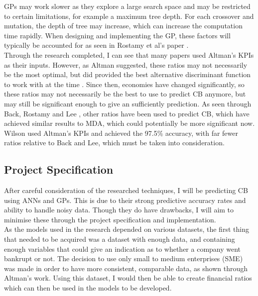 \documentclass[11pt]{article}
\begin{document}
GPs may work slower as they explore a large search space and may be restricted to certain limitations, for example a maximum tree depth. For each crossover and mutation, the depth of tree may increase, which can increase the computation time rapidly. When designing and implementing the GP, these factors will typically be accounted for as seen in Rostamy et al's paper \cite{ref-twelve}. \\

Through the research completed, I can see that many papers used Altman's KPIs as their inputs. However, as Altman suggested, these ratios may not necessarily be the most optimal, but did provided the best alternative discriminant function to work with at the time \cite{ref-six}. Since then, economies have changed significantly, so these ratios may not necessarily be the best to use to predict CB anymore, but may still be significant enough to give an sufficiently prediction. As seen through Back, Rostamy and Lee \cite{ref-thirt,ref-twelve, ref-eleven}, other ratios have been used to predict CB, which have achieved similar results to MDA, which could potentially be more significant now. Wilson used Altman's KPIs and achieved the 97.5\% accuracy, with far fewer ratios relative to Back and Lee, which must be taken into consideration.
\subsection{Project Specification}\label{subsec:proj}
After careful consideration of the researched techniques, I will be predicting CB using ANNs and GPs. This is due to their strong predictive accuracy rates and ability to handle noisy data. Though they do have drawbacks, I will aim to minimise these through the project specification and implementation.\\

As the models used in the research depended on various datasets, the first thing that needed to be acquired was a dataset with enough data, and containing enough variables that could give an indication as to whether a company went bankrupt or not. The decision to use only small to medium enterprises (SME) was made in order to have more consistent, comparable data, as shown through Altman's work. Using this dataset, I would then be able to create financial ratios which can then be used in the models to be developed. 
\end{document}
